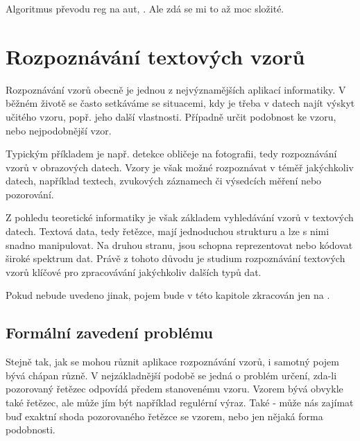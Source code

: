 \documentclass[a4paper,10pt]{article}
\begin{document}
Algoritmus převodu reg na aut, \cite{StaCir-ConsFuzzAutFuzzRegExp}. Ale zdá se mi to až moc složité.



\section{Rozpoznávání textových vzorů}

Rozpoznávání vzorů obecně je jednou z nejvýznamějších aplikací informatiky. V běžném životě se často setkáváme se situacemi, kdy je třeba v datech najít výskyt učitého vzoru, popř. jeho další vlastnosti. Případně určit podobnost ke vzoru, nebo nejpodobnější vzor.

Typickým příkladem je např. detekce obličeje na fotografii, tedy rozpoznávání vzorů v obrazových datech. Vzory je však možné rozpoznávat v téměř jakýchkoliv datech, například textech, zvukových záznamech či výsedcích měření nebo pozorování.

Z pohledu teoretické informatiky je však základem vyhledávání vzorů v textových datech. Textová data, tedy řetězce, mají jednoduchou strukturu a lze s nimi snadno manipulovat. Na druhou stranu, jsou schopna reprezentovat nebo kódovat široké spektrum dat. Právě z tohoto důvodu je studium rozpoznávání textových vzorů klíčové pro zpracovávání jakýchkoliv dalších typů dat.

\begin{note}
 Pokud nebude uvedeno jinak, pojem  bude v této kapitole zkracován jen na .
\end{note}

\subsection{Formální zavedení problému}
Stejně tak, jak se mohou různit aplikace rozpoznávání vzorů, i samotný pojem  bývá chápan různě. V nejzákladnější podobě se jedná o problém určení, zda-li pozorovaný řetězec odpovídá předem stanovenému vzoru. Vzorem bývá obvykle také řetězec, ale může jím být například regulérní výraz. Také - může nás zajímat buď exaktní shoda pozorovaného řetězce se vzorem, nebo jen nějaká forma podobnosti. 
\end{document}
